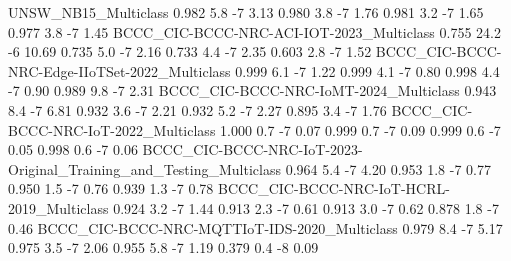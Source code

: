 UNSW_NB15_Multiclass                                                  0.982                5.8           -7            3.13      0.980                   3.8              -7               1.76      0.981                   3.2              -7               1.65       0.977                    3.8               -7                1.45
BCCC_CIC-BCCC-NRC-ACI-IOT-2023_Multiclass                             0.755               24.2           -6           10.69      0.735                   5.0              -7               2.16      0.733                   4.4              -7               2.35       0.603                    2.8               -7                1.52
BCCC_CIC-BCCC-NRC-Edge-IIoTSet-2022_Multiclass                        0.999                6.1           -7            1.22      0.999                   4.1              -7               0.80      0.998                   4.4              -7               0.90       0.989                    9.8               -7                2.31
BCCC_CIC-BCCC-NRC-IoMT-2024_Multiclass                                0.943                8.4           -7            6.81      0.932                   3.6              -7               2.21      0.932                   5.2              -7               2.27       0.895                    3.4               -7                1.76
BCCC_CIC-BCCC-NRC-IoT-2022_Multiclass                                 1.000                0.7           -7            0.07      0.999                   0.7              -7               0.09      0.999                   0.6              -7               0.05       0.998                    0.6               -7                0.06
BCCC_CIC-BCCC-NRC-IoT-2023-Original_Training_and_Testing_Multiclass   0.964                5.4           -7            4.20      0.953                   1.8              -7               0.77      0.950                   1.5              -7               0.76       0.939                    1.3               -7                0.78
BCCC_CIC-BCCC-NRC-IoT-HCRL-2019_Multiclass                            0.924                3.2           -7            1.44      0.913                   2.3              -7               0.61      0.913                   3.0              -7               0.62       0.878                    1.8               -7                0.46
BCCC_CIC-BCCC-NRC-MQTTIoT-IDS-2020_Multiclass                         0.979                8.4           -7            5.17      0.975                   3.5              -7               2.06      0.955                   5.8              -7               1.19       0.379                    0.4               -8                0.09
